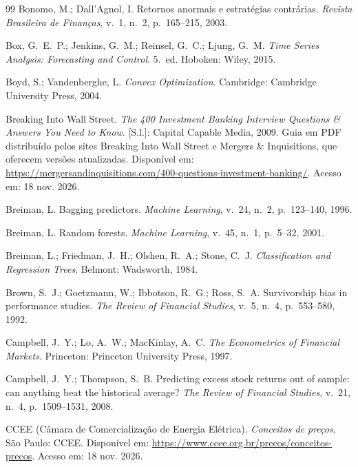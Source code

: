 \begin{thebibliography}{99}
Bonomo, M.; Dall'Agnol, I. Retornos anormais e estratégias contrárias. \emph{Revista Brasileira de Finanças}, v.~1, n.~2, p.~165--215, 2003.

Box, G.~E.~P.; Jenkins, G.~M.; Reinsel, G.~C.; Ljung, G.~M. \emph{Time Series Analysis: Forecasting and Control}. 5.~ed. Hoboken: Wiley, 2015.

Boyd, S.; Vandenberghe, L. \emph{Convex Optimization}. Cambridge: Cambridge University Press, 2004.

Breaking Into Wall Street. \emph{The 400 Investment Banking Interview Questions \& Answers You Need to Know}. [S.l.]: Capital Capable Media, 2009. Guia em PDF distribuído pelos sites Breaking Into Wall Street e Mergers \& Inquisitions, que oferecem versões atualizadas. Disponível em: \url{https://mergersandinquisitions.com/400-questions-investment-banking/}. Acesso em: 18 nov. 2026.

Breiman, L. Bagging predictors. \emph{Machine Learning}, v.~24, n.~2, p.~123--140, 1996.

Breiman, L. Random forests. \emph{Machine Learning}, v.~45, n.~1, p.~5--32, 2001.

Breiman, L.; Friedman, J.~H.; Olshen, R.~A.; Stone, C.~J. \emph{Classification and Regression Trees}. Belmont: Wadsworth, 1984.

Brown, S.~J.; Goetzmann, W.; Ibbotson, R.~G.; Ross, S.~A. Survivorship bias in performance studies. \emph{The Review of Financial Studies}, v.~5, n.~4, p.~553--580, 1992.

Campbell, J.~Y.; Lo, A.~W.; MacKinlay, A.~C. \emph{The Econometrics of Financial Markets}. Princeton: Princeton University Press, 1997.

Campbell, J.~Y.; Thompson, S.~B. Predicting excess stock returns out of sample: can anything beat the historical average? \emph{The Review of Financial Studies}, v.~21, n.~4, p.~1509--1531, 2008.

CCEE (Câmara de Comercialização de Energia Elétrica). \emph{Conceitos de preços}. São Paulo: CCEE. Disponível em: \url{https://www.ccee.org.br/precos/conceitos-precos}. Acesso em: 18 nov. 2026.


\end{thebibliography}
